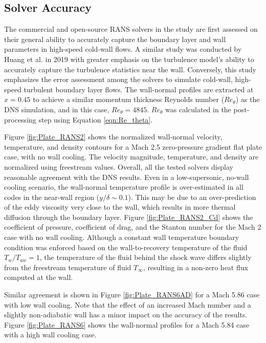 \documentclass[journal ]{new-aiaa}
\begin{document}
\subsection{Solver Accuracy}
The commercial and open-source RANS solvers in the study are first assessed on their general ability to accurately capture the boundary layer and wall parameters in high-speed cold-wall flows. A similar study was conducted by Huang et al. \cite{Huang2019} in 2019 with greater emphasis on the turbulence model's ability to accurately capture the turbulence statistics near the wall. Conversely, this study emphasizes the error assessment among the solvers to simulate cold-wall, high-speed turbulent boundary layer flows.  %
The wall-normal profiles are extracted at $x = 0.45$ to achieve a similar momentum thickness Reynolds number ($Re_{\theta}$) as the DNS simulation, and in this case, $Re_{\theta} = 4845$. $Re_{\theta}$ was calculated in the post-processing step using Equation \eqref{eqn:Re_theta}.


Figure \ref{fig:Plate_RANS2} shows the normalized wall-normal velocity, temperature, and density contours for a Mach 2.5 zero-pressure gradient flat plate case, with no wall cooling. The velocity magnitude, temperature, and density are normalized using freestream values. %
Overall, all the tested solvers display reasonable agreement with the DNS results. Even in a low-supersonic, no-wall cooling scenario, the wall-normal temperature profile is over-estimated in all codes in the near-wall region ($y/\delta \sim 0.1$). This may be due to an over-prediction of the eddy viscosity very close to the wall, which results in more thermal diffusion through the boundary layer. Figure \ref{fig:Plate_RANS2_Cd} shows the coefficient of pressure, coefficient of drag, and the Stanton number for the Mach 2 case with no wall cooling. Although a constant wall temperature boundary condition was enforced based on the wall-to-recovery temperature of the fluid $T_w/T_{aw} = 1$, the temperature of the fluid behind the shock wave differs slightly from the freestream temperature of fluid $T_{\infty}$, resulting in a non-zero heat flux computed at the wall. 

Similar agreement is shown in Figure \ref{fig:Plate_RANS6AD} for a Mach 5.86 case with low wall cooling. 
Note that the effect of an increased Mach number and a slightly non-adiabatic wall has a minor impact on the accuracy of the results. Figure \ref{fig:Plate_RANS6} shows the wall-normal profiles for a Mach 5.84 case with a high wall cooling case. 
\end{document}
